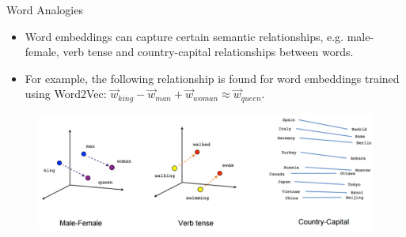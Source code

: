 \begin{frame}{Word Analogies}
\begin{scriptsize}
\begin{itemize}
   
\item Word embeddings can capture certain semantic relationships, e.g. male-female, verb tense and country-capital relationships between words.

\item For example, the following relationship is found for word embeddings
trained using Word2Vec: $\vec{w}_{king} - \vec{w}_{man} + \vec{w}_{woman} \approx \vec{w}_{queen}$.

    
\end{itemize}

 \begin{figure}[h]
    	\includegraphics[scale = 0.2]{pics/linear-relationships.png}
    \end{figure}

\end{scriptsize}
\end{frame}



